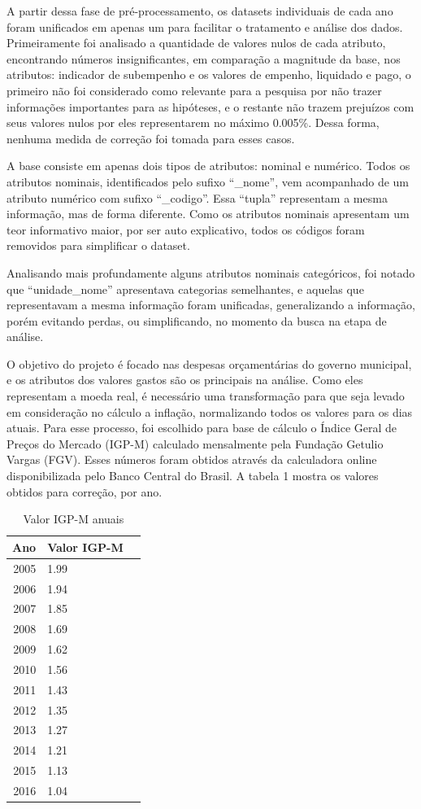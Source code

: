 \documentclass[authoryear]{elsarticle}
\begin{document}
A partir dessa fase de pré-processamento, os datasets individuais de cada ano foram unificados em apenas um para facilitar o tratamento e análise dos dados. Primeiramente foi analisado a quantidade de valores nulos de cada atributo, encontrando números insignificantes, em comparação a magnitude da base, nos atributos: indicador de subempenho e os valores de empenho, liquidado e pago, o primeiro não foi considerado como relevante para a pesquisa por não trazer informações importantes para as hipóteses, e o restante não trazem prejuízos com seus valores nulos por eles representarem no máximo 0.005\%. Dessa forma, nenhuma medida de correção foi tomada para esses casos.


A base consiste em apenas dois tipos de atributos: nominal e numérico. Todos os atributos nominais, identificados pelo sufixo “\_nome”, vem acompanhado de um atributo numérico com sufixo “\_codigo”. Essa “tupla” representam a mesma informação, mas de forma diferente. Como os atributos nominais apresentam um teor informativo maior, por ser auto explicativo, todos os códigos foram removidos para simplificar o dataset.

Analisando mais profundamente alguns atributos nominais categóricos, foi notado que “unidade\_nome” apresentava categorias semelhantes, e aquelas que representavam a mesma informação foram unificadas, generalizando a informação, porém evitando perdas, ou simplificando, no momento da busca na etapa de análise.


O objetivo do projeto é focado nas despesas orçamentárias do governo municipal, e os atributos dos valores gastos são os principais na análise. Como eles representam a moeda real, é necessário uma transformação para que seja levado em consideração no cálculo a inflação, normalizando todos os valores para os dias atuais. Para esse processo, foi escolhido para base de cálculo o Índice Geral de Preços do Mercado (IGP-M) calculado mensalmente pela Fundação Getulio Vargas (FGV)\citep{fgvibre2018}. Esses números foram obtidos através da calculadora online disponibilizada pelo Banco Central do Brasil\citep{bcb2018}. A tabela 1 mostra os valores obtidos para correção, por ano.

\begin{table}[h]
\centering
\caption{Valor IGP-M anuais}
\begin{tabular}{r|lr}

Ano & Valor IGP-M \\ 
\hline                             
 2005 & 1.99 \\
 2006 & 1.94 \\
 2007 & 1.85 \\
 2008 & 1.69 \\
 2009 & 1.62 \\
 2010 & 1.56 \\
 2011 & 1.43 \\
 2012 & 1.35 \\
 2013 & 1.27 \\
 2014 & 1.21 \\
 2015 & 1.13 \\
 2016 & 1.04
\end{tabular}
\end{table}
\end{document}
